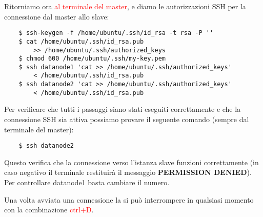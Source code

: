 Ritorniamo ora \textcolor{red}{al terminale del master}, e diamo le autorizzazioni SSH per la connessione dal master allo slave:

\begin{verbatim}
    $ ssh-keygen -f /home/ubuntu/.ssh/id_rsa -t rsa -P ''
    $ cat /home/ubuntu/.ssh/id_rsa.pub
        >> /home/ubuntu/.ssh/authorized_keys
    $ chmod 600 /home/ubuntu/.ssh/my-key.pem
    $ ssh datanode1 'cat >> /home/ubuntu/.ssh/authorized_keys'
        < /home/ubuntu/.ssh/id_rsa.pub
    $ ssh datanode2 'cat >> /home/ubuntu/.ssh/authorized_keys'
        < /home/ubuntu/.ssh/id_rsa.pub
\end{verbatim}

Per verificare che tutti i passaggi siano stati eseguiti correttamente e che la connessione SSH sia attiva possiamo provare il seguente comando (sempre dal terminale del master):

\begin{verbatim}
    $ ssh datanode2
\end{verbatim}

Questo verifica che la connessione verso l'istanza slave funzioni correttamente (in caso negativo il terminale restituirà il messaggio \textbf{PERMISSION DENIED}). Per controllare datanode1 basta cambiare il numero.

Una volta avviata una connessione la si può interrompere in qualsiasi momento con la combinazione \textcolor{red}{ctrl+D}.



